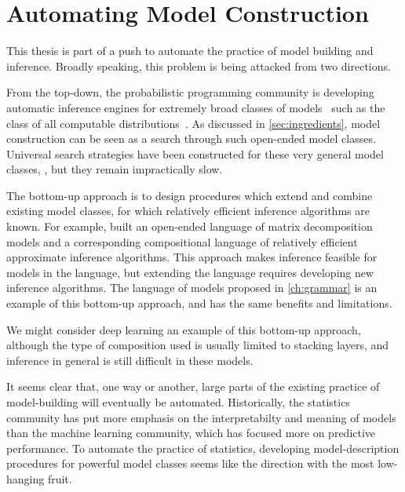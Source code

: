 \section{Automating Model Construction}

This thesis is part of a push to automate the practice of model building and inference.
Broadly speaking, this problem is being attacked from two directions.

From the top-down, the probabilistic programming community is developing automatic inference engines for extremely broad classes of models~\citep{goodman2008church,mansinghka2014venture,liang2010learning} such as the class of all computable distributions~\citep{solomonoff1964formal, li2009introduction}.
As discussed in \cref{sec:ingredients}, model construction can be seen as a search through such open-ended model classes.
Universal search strategies have been constructed for these very general model classes, \citep{hutter2002fastest,schmidhuber2002speed,levin1973universal}, but they remain impractically slow.

The bottom-up approach is to design procedures which extend and combine existing model classes, for which relatively efficient inference algorithms are known.
For example, \citet{roger-grosse-thesis} built an open-ended language of matrix decomposition models and a corresponding compositional language of relatively efficient approximate inference algorithms.
This approach makes inference feasible for models in the language, but extending the language requires developing new inference algorithms.
The language of models proposed in \cref{ch:grammar} is an example of this bottom-up approach, and has the same benefits and limitations. %

We might consider deep learning an example of this bottom-up approach, although the type of composition used is usually limited to stacking layers, and inference in general is still difficult in these models.


It seems clear that, one way or another, large parts of the existing practice of model-building will eventually be automated.
Historically, the statistics community has put more emphasis on the interpretabilty and meaning of models than the machine learning community, which has focused more on predictive performance.
To automate the practice of statistics, developing model-description procedures for powerful model classes seems like the direction with the most low-hanging fruit.




